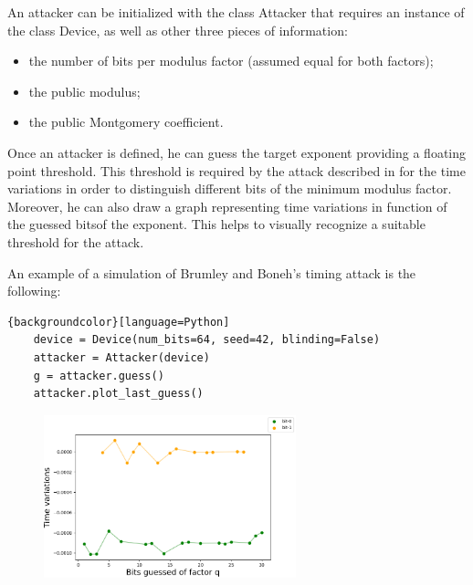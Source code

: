 An attacker can be initialized with the class Attacker that requires an instance of the class Device, as well as other three pieces of information:

\begin{itemize}
  \item the number of bits per modulus factor (assumed equal for both factors);
  \item the public modulus;
  \item the public Montgomery coefficient.
\end{itemize}

Once an attacker is defined, he can guess the target exponent providing a floating point threshold. This threshold is required by the attack described in  for the time variations in order to distinguish different bits of the minimum modulus factor. Moreover, he can also draw a graph representing time variations in function of the guessed bitsof the exponent. This helps to visually recognize a suitable threshold for the attack.

An example of a simulation of Brumley and Boneh's timing attack is the following:
\begin{lstlisting}{backgroundcolor}[language=Python]
    device = Device(num_bits=64, seed=42, blinding=False)
    attacker = Attacker(device)
    g = attacker.guess()
    attacker.plot_last_guess()
\end{lstlisting}

\begin{figure}[h]
  \includegraphics[width=0.65\textwidth]{figures/brumley_and_boneh_output_example}
\end{figure}


